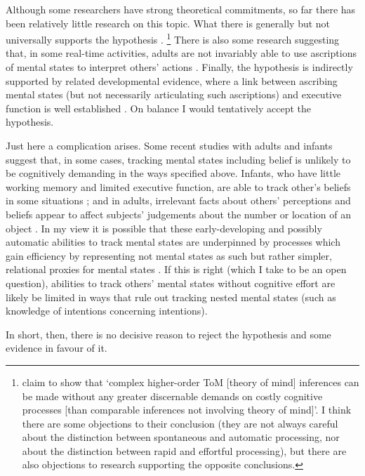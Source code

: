 \documentclass[12pt,letterpaper]{extarticle}
\begin{document}
Although some researchers have strong theoretical commitments, so far there has been relatively little research on this topic.
What there is generally but not universally supports the hypothesis \citep[e.g.][]{McKinnon:2007rr,Apperly:2008jv}.%
%
\footnote{
\citet[][p.\ 193]{ferguson_eye_2011} claim to show that `complex higher-order ToM [theory of mind] inferences can be made without any greater discernable demands on costly cognitive processes [than comparable inferences not involving theory of mind]'.
I think there are some objections to their conclusion (they are not always careful about the distinction between spontaneous and automatic processing, nor about the distinction between rapid and effortful processing), but there are also objections to research supporting the opposite conclusions.
}
%
There is also some research suggesting that, in some real-time activities, adults are not invariably able to use ascriptions of mental states to interpret others' actions \citep{Keysar:2003xu,apperly_why_2010}.
Finally, the hypothesis is indirectly supported by related developmental evidence, where a link between ascribing mental states (but not necessarily articulating such ascriptions) and executive function is well established \citep{Perner:1999yr}.
On balance I would tentatively accept the hypothesis.

Just here a complication arises.
Some recent studies with adults and infants suggest that, in some cases, tracking mental states including belief is unlikely to be cognitively demanding in the ways specified above.
Infants, who have little working memory and limited executive function, are able to track other's beliefs in some situations \citep{Onishi:2005hm,Baillargeon:gx,Southgate:2007js};
and in adults, irrelevant facts about others' perceptions and beliefs appear to affect subjects' judgements about the number or location of an object \citep{Samson:2010jm,kovacs_social_2010}.
In my view it is possible that these early-developing and possibly automatic abilities to track mental states are underpinned by processes which gain efficiency by representing not mental states as such but rather  simpler, relational proxies for mental states \citep{Apperly:2009ju,butterfill_minimal,surtees_direct_2011}.
If this is right (which I take to be an open question), abilities to track others' mental states without cognitive effort are likely be limited in ways that rule out tracking nested mental states (such as knowledge of intentions concerning intentions).

In short, then, there is no decisive reason to reject the hypothesis and  some evidence in favour of it.
\end{document}
